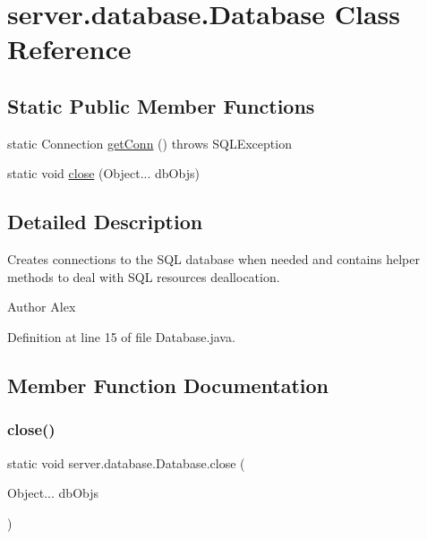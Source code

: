 \hypertarget{classserver_1_1database_1_1_database}{}\section{server.\+database.\+Database Class Reference}
\label{classserver_1_1database_1_1_database}
\subsection*{Static Public Member Functions}
\begin{DoxyCompactItemize}
\item 
static Connection \hyperlink{classserver_1_1database_1_1_database_aba33cd2ea573a20b822bcd2a4dc749ea}{get\+Conn} ()  throws S\+Q\+L\+Exception 
\item 
static void \hyperlink{classserver_1_1database_1_1_database_ad186e6746e4dbc2ac8d21c8223fa63d0}{close} (Object... db\+Objs)
\end{DoxyCompactItemize}


\subsection{Detailed Description}
Creates connections to the S\+QL database when needed and contains helper methods to deal with S\+QL resources deallocation. \begin{DoxyAuthor}{Author}
Alex 
\end{DoxyAuthor}


Definition at line 15 of file Database.\+java.



\subsection{Member Function Documentation}
\hypertarget{classserver_1_1database_1_1_database_ad186e6746e4dbc2ac8d21c8223fa63d0}{}\label{classserver_1_1database_1_1_database_ad186e6746e4dbc2ac8d21c8223fa63d0} 
\subsubsection{\texorpdfstring{close()}{close()}}
{\footnotesize\ttfamily static void server.\+database.\+Database.\+close (\begin{DoxyParamCaption}\item[{Object...}]{db\+Objs }\end{DoxyParamCaption})\hspace{0.3cm}{\ttfamily [static]}}

